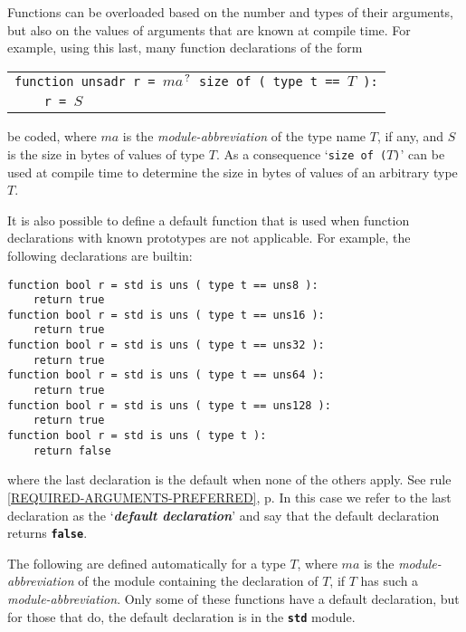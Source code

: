 \documentclass[12pt]{article}
\newcommand{\TT}[1]{{\tt \bfseries #1}}
\newcommand{\key}[1]{{\bf \em #1}\index{#1}}
\newcommand{\pagref}[1]{p\pageref{#1}}
\newcommand{\QMARK}{{$^{\,\mbox{\footnotesize ?}}$}}
\newcommand{\TS}{\hspace*{0in}\tt}
\newenvironment{indpar}[1][0.3in]%
	{\begin{list}{}%
		     {\setlength{\itemsep}{0in}%
		      \setlength{\topsep}{0in}%
		      \setlength{\parsep}{1ex}%
		      \setlength{\labelwidth}{#1}%
		      \setlength{\leftmargin}{#1}%
		      \addtolength{\leftmargin}{\labelsep}}%
	 \item}%
	{\end{list}}
\begin{document}
Functions can be overloaded based on the number and types
of their arguments, but also on the values of arguments that
are known at compile time.  For example, using this last,
many function declarations of the form
\begin{center}
\begin{tabular}{l}
{\tt function unsadr r = $ma$\QMARK{} size of ( type t == $T$ ):} \\
{\TS ~~~~r = $S$}
\end{tabular}
\end{center}
be coded, where $ma$ is the {\em module-abbreviation} of the
type name $T$, if any, and $S$ is the size in bytes of values of type $T$.
As a consequence `{\tt size of ($T$)}' can be used at compile
time to determine the size in bytes of values of an arbitrary type
$T$.

It is also possible to define a default function that is used when
function declarations with known prototypes are not applicable.
For example, the following declarations are builtin:
\begin{indpar}\begin{verbatim}
function bool r = std is uns ( type t == uns8 ):
    return true
function bool r = std is uns ( type t == uns16 ):
    return true
function bool r = std is uns ( type t == uns32 ):
    return true
function bool r = std is uns ( type t == uns64 ):
    return true
function bool r = std is uns ( type t == uns128 ):
    return true
function bool r = std is uns ( type t ):
    return false
\end{verbatim}\end{indpar}
where the last declaration is the default when none of the others
apply.  See
rule \ref{REQUIRED-ARGUMENTS-PREFERRED},
\pagref{REQUIRED-ARGUMENTS-PREFERRED}.
In this case we refer to the last declaration as the
`\key{default declaration}' and say that the default declaration
returns \TT{false}.

The following are defined automatically for a type $T$, where
$ma$ is the {\em module-abbreviation} of the module containing
the declaration of $T$, if $T$ has such a {\em module-abbreviation}.
Only some of these functions have a default declaration, but for
those that do, the default declaration is in the \TT{std} module.
\end{document}
